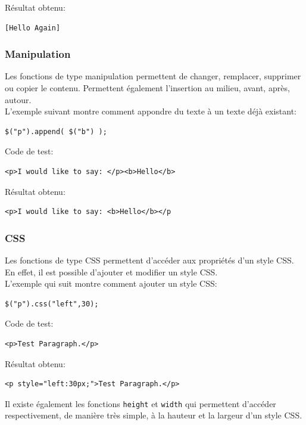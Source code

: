 \documentclass[10pt,a4paper,titlepage]{article}
\begin{document}
Résultat obtenu:
\begin{lstlisting}
[Hello Again]
\end{lstlisting}

\subsubsection{Manipulation}
Les fonctions de type manipulation permettent de changer, remplacer, supprimer ou copier le contenu. Permettent également l'insertion au milieu, avant, après, autour.\\

L'exemple suivant montre comment appondre du texte à un texte déjà existant:
\begin{lstlisting}
$("p").append( $("b") );
\end{lstlisting}

Code de test:
\begin{lstlisting}
<p>I would like to say: </p><b>Hello</b>
\end{lstlisting}

Résultat obtenu:
\begin{lstlisting}
<p>I would like to say: <b>Hello</b></p
\end{lstlisting}

\subsubsection{CSS}
Les fonctions de type CSS permettent d'accéder aux propriétés d'un style CSS. En effet, il est possible d'ajouter et modifier un style CSS.\\

L'exemple qui suit montre comment ajouter un style CSS:
\begin{lstlisting}
$("p").css("left",30);
\end{lstlisting}

Code de test:
\begin{lstlisting}
<p>Test Paragraph.</p>
\end{lstlisting}

Résultat obtenu:
\begin{lstlisting}
<p style="left:30px;">Test Paragraph.</p>
\end{lstlisting}

Il existe également les fonctions \texttt{height} et \texttt{width} qui permettent d'accéder respectivement, de manière très simple,  à la hauteur et la largeur d'un style CSS.
\end{document}
